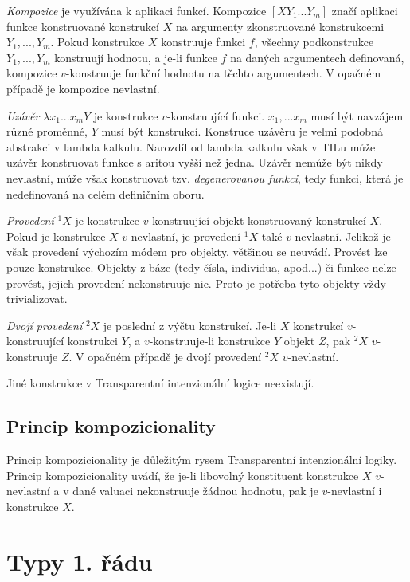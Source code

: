 \textit{Kompozice} je využívána k aplikaci funkcí. Kompozice $[X Y_1...Y_m]$ značí aplikaci funkce
konstruované konstrukcí $X$ na argumenty zkonstruované konstrukcemi $Y_1,...,Y_m$. Pokud konstrukce
$X$ konstruuje funkci $f$, všechny podkonstrukce $Y_1,...,Y_m$ konstruují hodnotu, a je-li funkce
$f$ na daných argumentech definovaná, kompozice $v$-konstruuje funkční hodnotu na těchto
argumentech. V opačném případě je kompozice nevlastní.

\textit{Uzávěr} $\lambda x_1...x_m Y$ je konstrukce $v$-konstruující funkci. $x_1,...x_m$ musí
být navzájem různé proměnné, $Y$ musí být konstrukcí. Konstruce uzávěru je velmi podobná abstrakci
v lambda kalkulu. Narozdíl od lambda kalkulu však v TILu může uzávěr konstruovat funkce s aritou
vyšší než jedna. Uzávěr nemůže být nikdy nevlastní, může však konstruovat tzv.
\textit{degenerovanou funkci}, tedy funkci, která je nedefinovaná na celém definičním oboru.

\textit{Provedení} ${}^1X$ je konstrukce $v$-konstruující objekt konstruovaný konstrukcí $X$.
Pokud je konstrukce $X$ $v$-nevlastní, je provedení ${}^1X$ také $v$-nevlastní. Jelikož je však
provedení výchozím módem pro objekty, většinou se neuvádí. Provést lze pouze konstrukce. Objekty
z báze (tedy čísla, individua, apod...) či funkce nelze provést, jejich provedení nekonstruuje nic.
Proto je potřeba tyto objekty vždy trivializovat.

\textit{Dvojí provedení} ${}^2X$ je poslední z výčtu konstrukcí. Je-li $X$ konstrukcí
$v$-konstruující konstrukci $Y$, a $v$-konstruuje-li konstrukce $Y$ objekt $Z$, pak ${}^2X$
$v$-konstruuje $Z$. V opačném případě je dvojí provedení ${}^2X$ $v$-nevlastní.

Jiné konstrukce v Transparentní intenzionální logice neexistují.

\subsection{Princip kompozicionality} 

Princip kompozicionality je důležitým rysem Transparentní intenzionální logiky. Princip
kompozicionality uvádí, že je-li libovolný konstituent konstrukce $X$ $v$-nevlastní a v dané
valuaci nekonstruuje žádnou hodnotu, pak je $v$-nevlastní i konstrukce $X$.

\section{Typy 1. řádu} \label{fst-order}

